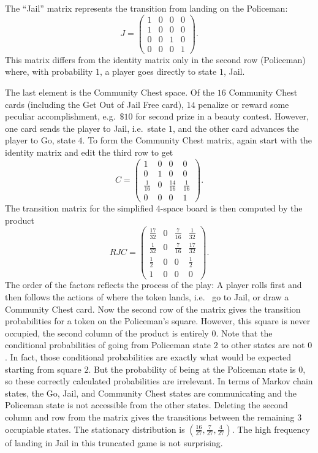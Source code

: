 \documentclass[12pt]{article}
\begin{document}
The ``Jail'' matrix represents the transition from landing on the
Policeman:
\[
    J =
    \begin{pmatrix}
        1 & 0 & 0 & 0 \\
        1 & 0 & 0 & 0 \\
        0 & 0 & 1 & 0 \\
        0 & 0 & 0 & 1
    \end{pmatrix}
    .
\] This matrix differs from the identity matrix only in the second row (Policeman)
where, with probability \( 1 \), a player goes directly to state \( 1 \),
Jail.

The last element is the Community Chest space.  Of the \( 16 \)
Community Chest cards (including the Get Out of Jail Free card), \( 14 \)
penalize or reward some peculiar accomplishment, e.g.\ \( \$10 \) for
second prize in a beauty contest.  However, one card sends the player to
Jail, i.e.\ state \( 1 \), and the other card advances the player to Go,
state \( 4 \).  To form the Community Chest matrix, again start with the
identity matrix and edit the third row to get
\[
    C =
    \begin{pmatrix}
        1 & 0 & 0 & 0 \\
        0 & 1 & 0 & 0 \\
        \frac{1}{16} & 0 & \frac{14}{16} & \frac{1}{16} \\
        0 & 0 & 0 & 1
    \end{pmatrix}
    .
\] The transition matrix for the simplified \( 4 \)-space board is then
computed by the product
\[
    RJC =
    \begin{pmatrix}
        \frac{17}{32} & 0 & \frac{7}{16} & \frac{1}{32} \\
        \frac{1}{32} & 0 & \frac{7}{16} & \frac{17}{32} \\
        \frac{1}{2} & 0 & 0 & \frac{1}{2} \\
        1 & 0 & 0 & 0
    \end{pmatrix}
    .
\] The order of the factors reflects the process of the play:  A player
rolls first and then follows the actions of where the token lands, i.e.\
%
go to Jail, or draw a Community Chest card.  Now the second row of the
matrix gives the transition probabilities for a token on the Policeman's
square.  However, this square is never occupied, the second column of
the product is entirely \( 0 \).  Note that the conditional
probabilities of going from Policeman state \( 2 \) to other states are
not \( 0 \). In fact, those conditional probabilities are exactly what
would be expected starting from square \( 2 \).  But the probability of
being at the Policeman state is \( 0 \), so these correctly calculated
probabilities are irrelevant.  In terms of Markov chain states, the Go,
Jail, and Community Chest states are communicating and the Policeman
state is not accessible from the other states.  Deleting the second
column and row from the matrix gives the transitions between the
remaining \( 3 \) occupiable states.  The stationary distribution is \(
(\frac{16}{27}, \frac{7}{27}, \frac{4}{27}) \).  The high frequency of
landing in Jail in this truncated game is not surprising.
\end{document}
